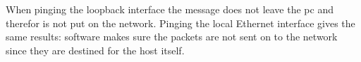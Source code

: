 When pinging the loopback interface the message does not leave the pc and therefor is not put on the network. Pinging the local Ethernet interface gives the same results: software makes sure the packets are not sent on to the network since they are destined for the host itself.